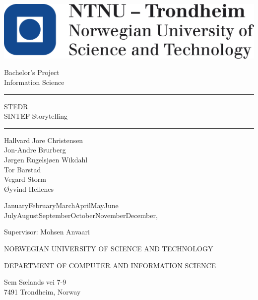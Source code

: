 
\begin{titlepage}
  \begin{center}
    \includegraphics[scale=0.5]{res/logo_ntnu_eng.png}
    
    \vspace{1cm}
    
    {\large Bachelor's Project}\\[1mm]
    {\large Information Science}
    
    \vspace{1cm}

    \rule{0.5\textwidth}{0.4pt}\par
    
    {\huge STEDR\\[1ex]
     SINTEF Storytelling}
    
    \rule{0.5\textwidth}{0.4pt}\par
    
    \vspace{1cm}
    
    {\large Hallvard Jore Christensen}\\
    {\large Jon-Andre Brurberg}\\
    {\large Jørgen Rugelsjøen Wikdahl}\\
    {\large Tor Barstad}\\
    {\large Vegard Storm}\\
    {\large Øyvind Hellenes}\\
    
    \vspace{\fill}
    
    {\large
      \ifcase\month\or
      January\or February\or March\or April\or May\or June\or
      July\or August\or September\or October\or November\or December\fi,
      \number\year
    }
    
    \vspace{\fill}
    
    Supervisor: Mohsen Anvaari
    
    \vspace{0.3cm}
    
    \vspace{\fill}
    
    NORWEGIAN UNIVERSITY OF SCIENCE AND TECHNOLOGY
    
    DEPARTMENT OF COMPUTER AND INFORMATION SCIENCE
    
    \vspace{.5cm}
    
   Sem Sælands vei 7-9\\
   
   7491 Trondheim, Norway
    
  \end{center}
\end{titlepage}


